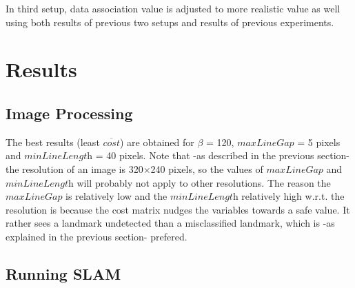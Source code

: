 \documentclass{ba-kecs}
\numberwithin{figure}{section}
\numberwithin{equation}{section}
\begin{document}
In third setup, data association value is adjusted to more realistic value as well using both results of previous two setups and results of previous experiments.


\section{Results}

\subsection{Image Processing}
The best results (least $\overline{\textit{cost}}$) are obtained for $\beta$ = 120,  $\textit{maxLineGap}$ = 5 pixels and $\textit{minLineLength}$ = 40 pixels. Note that -as described in the previous section- the resolution of an image is 320$\times$240 pixels, so the values of $\textit{maxLineGap}$ and $\textit{minLineLength}$ will probably not apply to other resolutions.
The reason the $\textit{maxLineGap}$ is relatively low and the $\textit{minLineLength}$ relatively high w.r.t. the resolution is because the cost matrix nudges the variables towards a safe value. It rather sees a landmark undetected than a misclassified landmark, which is -as explained in the previous section- prefered.

\subsection{Running SLAM}
\end{document}
